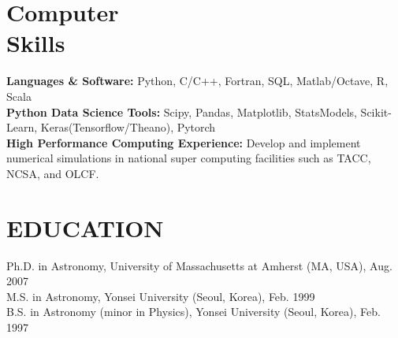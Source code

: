 \documentclass[margin,centered]{res}
\begin{document}
\begin{resume}
\section{Computer \\ Skills} 
{\bf Languages \& Software:} Python, C/C++, Fortran, SQL, Matlab/Octave, R, Scala\\
{\bf Python Data Science Tools:} Scipy, Pandas, Matplotlib, StatsModels, Scikit-Learn, Keras(Tensorflow/Theano), Pytorch \\
{\bf High Performance Computing Experience:} Develop and implement numerical simulations in national super computing facilities such as TACC, NCSA, and OLCF.

\section{EDUCATION} 
Ph.D. in Astronomy, University of Massachusetts at Amherst (MA, USA), Aug. 2007 \\
M.S. in Astronomy, Yonsei University (Seoul, Korea), Feb. 1999 \\
B.S. in Astronomy (minor in Physics), Yonsei University (Seoul, Korea), Feb. 1997 \\
 

\end{resume}
\end{document}

